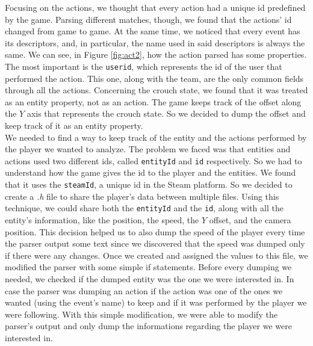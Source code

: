 	Focusing on the actions, we thought that every action had a unique id predefined by the game. 
	Parsing different matches, though, we found that the actions' id changed from game to game. 
	At the same time, we noticed that every event has its descriptors, and, in particular, the name used in said descriptors is always the same. 
	We can see, in Figure \ref{fig:act2}, how the action parsed has some properties. 
	The most important is the \texttt{userid}, which represents the id of the user that performed the action. 
	This one, along with the team, are the only common fields through all the actions. 
	Concerning the crouch state, we found that it was treated as an entity property, not as an action. 
	The game keeps track of the offset along the $Y$ axis that represents the crouch state. 
	So we decided to dump the offset and keep track of it as an entity property.\\
	We needed to find a way to keep track of the entity and the actions performed by the player we wanted to analyze. 
	The problem we faced was that entities and actions used two different ids, called \texttt{entityId} and \texttt{id} respectively. 
	So we had to understand how the game gives the id to the player and the entities. 
	We found that it uses the \texttt{steamId}, a unique id in the \gls{Steam} platform. 
	So we decided to create a \emph{.h} file to share the player's data between multiple files. 
	Using this technique, we could share both the \texttt{entityId} and the \texttt{id}, along with all the entity's information, like the position, the speed, the $Y$ offset, and the camera position. 
	This decision helped us to also dump the speed of the player every time the parser output some text since we discovered that the speed was dumped only if there were any changes. 
	Once we created and assigned the values to this file, we modified the parser with some simple if statements. 
	Before every dumping we needed, we checked if the dumped entity was the one we were interested in. 
	In case the parser was dumping an action if the action was one of the ones we wanted  (using the event's name) to keep and if it was performed by the player we were following. 
	With this simple modification, we were able to modify the parser's output and only dump the informations regarding the player we were interested in.
